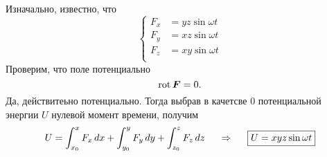 Изначально, известно, что
\begin{equation}
    \left\{\begin{aligned}
        F_x &=  yz \sin \omega t\\
        F_y &= x z \sin \omega t\\
        F_z &= xy \sin \omega t\\
    \end{aligned}\right.
\end{equation}
Проверим, что поле потенциально
\begin{equation}
    \mathop{\mathrm{rot}}\nolimits \mbox{\boldmath $F$} = 0.
\end{equation}
Да, действитеьно потенциально. Тогда выбрав в качетсве $0$ потенциальной энергии $U$ нулевой момент времени, получим
\begin{equation}
    U = \int_{x_0}^{x} F_x \, d x +
    \int_{y_0}^{y} F_y \, d y +
    \int_{z_0}^{z} F_z \, d z
    \hspace{0.5cm} \Rightarrow \hspace{0.5cm} 
    \boxed{
        U = xyz \sin \omega t
    }
\end{equation}




